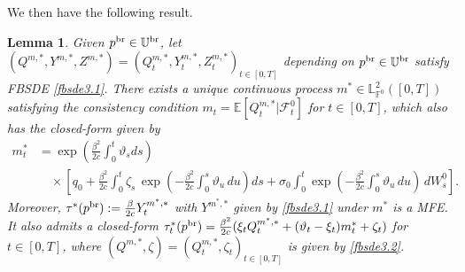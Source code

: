 \documentclass[11pt]{article}
\newtheorem{lemma}{Lemma}[section]
\numberwithin{equation}{section}
\begin{document}
We then have the following result. 
\begin{lemma}\label{mfe}
Given $p^{{\rm br}}\in\mathbb{U}^{\rm br}$, let $(Q^{m,*},Y^{m,*},Z^{m,*})=(Q_t^{m,*},Y_t^{m,*},Z_t^{m,*})_{t\in[0,T]}$ depending on $p^{{\rm br}}\in\mathbb{U}^{\rm br}$ satisfy FBSDE \eqref{fbsde3.1}.
There exists a unique continuous process $m^*\in \mathbb{L}_{\mathbb{F}^0}^2([0,T])$ satisfying the consistency condition $m_t=\mathbb{E}[Q_t^{m, *}|\mathcal{F}_t^0]$ for $t\in [0, T]$, which also has the closed-form given by
\begin{align}\label{eq:closedformfixedm}
 m_t^* & = \exp\left( \frac{\beta^2}{2c} \int_0^t \vartheta_sds \right)\nonumber\\
 &\quad\times
 \left[ 
 q_0 
 + \frac{\beta^2}{2c} \int_0^t \zeta_s \, \exp\left( -\frac{\beta^2}{2c} \int_0^s \vartheta_u\, du \right) ds 
 + \sigma_0 \int_0^t \exp\left( -\frac{\beta^2}{2c} \int_0^s \vartheta_u \, du \right) \, dW^0_s 
 \right].
\end{align}
Moreover, $\tau^*(p^{{\rm br}}):=\frac{\beta}{2c}Y_t^{m^*,*}$ with   $Y^{m^*,*}$ given by \eqref{fbsde3.1} under $m^*$ is a MFE. It also admits a closed-form $\tau_t^*(p^{{\rm br}})=\frac{\beta^2}{2c}(\xi_tQ_t^{m^*,*}+(\vartheta_t-\xi_t)m_t^*+\zeta_t)$ for $t\in[0,T]$, where $(Q^{m,*}, \zeta)=(Q_t^{m,*},\zeta_t)_{t\in[0,T]}$ is given by \eqref{fbsde3.2}. 
\end{lemma}
\end{document}
